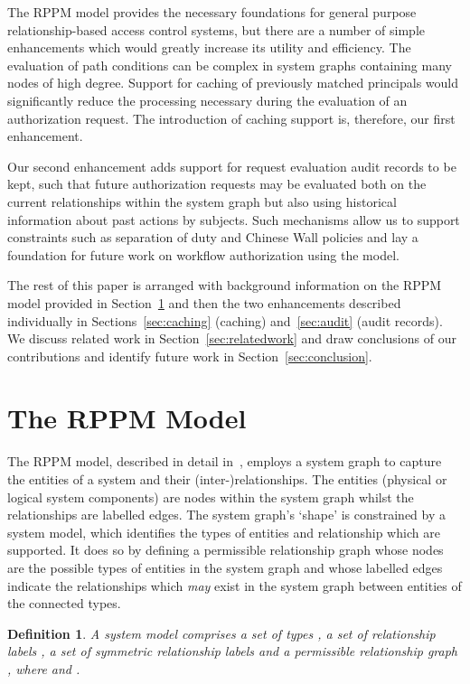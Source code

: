 \documentclass{article}
\newtheorem{definition}{Definition}
\begin{document}
The RPPM model provides the necessary foundations for general purpose relationship-based access control systems, but there are a number of simple enhancements which would greatly increase its utility and efficiency.
The evaluation of path conditions can be complex in system graphs containing many nodes of high degree.
Support for caching of previously matched principals would significantly reduce the processing necessary during the evaluation of an authorization request.
The introduction of caching support is, therefore, our first enhancement.

Our second enhancement adds support for request evaluation audit records to be kept, such that future authorization requests may be evaluated both on the current relationships within the system graph but also using historical information about past actions by subjects.
Such mechanisms allow us to support constraints such as separation of duty and Chinese Wall policies and lay a foundation for future work on workflow authorization using the model.

The rest of this paper is arranged with background information on the RPPM model provided in Section~\ref{sec:preliminaries} and then the two enhancements described individually in Sections~\ref{sec:caching} (caching) and~\ref{sec:audit} (audit records).
We discuss related work in Section~\ref{sec:relatedwork} and draw conclusions of our contributions and identify future work in Section~\ref{sec:conclusion}.

\section{The RPPM Model}\label{sec:preliminaries}
The RPPM model, described in detail in~\cite{CramptonS14}, employs a system graph to capture the entities of a system and their (inter-)relationships. The entities (physical or logical system components) are nodes within the system graph whilst the relationships are labelled edges. The system graph's `shape' is constrained by a system model, which identifies the types of entities and relationship which are supported. It does so by defining a permissible relationship graph whose nodes are the possible types of entities in the system graph and whose labelled edges indicate the relationships which \emph{may} exist in the system graph between entities of the connected types.

\begin{definition}
    A \emph{system model} comprises a set of types , a set of relationship labels , a set of \emph{symmetric} relationship labels  and a \emph{permissible relationship graph} , where  and .
\end{definition}
\end{document}
